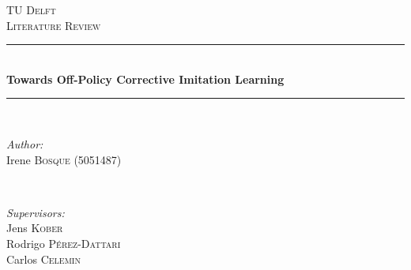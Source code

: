 \lstset{style=mystyle}





\begin{titlepage}

\newcommand{\HRule}{\rule{\linewidth}{0.5mm}} %

\center %
 

\textsc{\LARGE TU Delft}\\[1.2cm] %
\textsc{\Large Literature Review}\\[0.5cm] %


\HRule \\[0.4cm]
{ \huge \bfseries  Towards Off-Policy Corrective Imitation Learning}\\[0.4cm] %
\HRule \\[1.0cm]
 


\begin{minipage}{0.5\textwidth}
\begin{flushleft} \large
\emph{Author:}\\
Irene \textsc{Bosque} (5051487)\\
\end{flushleft}
\end{minipage}
~
\begin{minipage}{0.4\textwidth}
\begin{flushright} \large
\emph{Supervisors:} \\
Jens \textsc{Kober}\\ %
Rodrigo \textsc{Pérez-Dattari}\\ %
Carlos \textsc{Celemin} %
\end{flushright}
\end{minipage}\\[2cm]


\end{titlepage}
